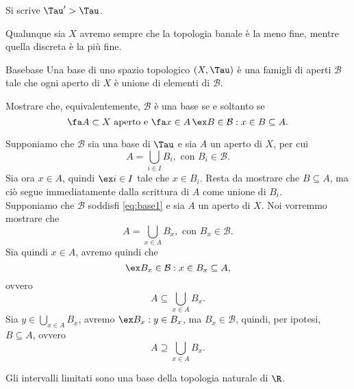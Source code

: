 \begin{notz}
    Si scrive \(\Tau'>\Tau\).
\end{notz}

\begin{oss}
    Qualunque sia \(X\) avremo sempre che la topologia banale è la meno fine, mentre quella discreta è la più fine.
\end{oss}

\begin{defn}{Base}{base}
    Una base di uno spazio topologico \((X,\Tau)\) è una famigli di aperti \(\mathcal{B}\) tale che ogni aperto di \(X\) è unione di elementi di \(\mathcal{B}\).
\end{defn}

\begin{exe}
    Mostrare che, equivalentemente, \(\mathcal{B}\) è una base se e soltanto se
    \begin{equation}\label{eq:base1}
        \fa A\subset X\text{ aperto e }\fa x\in A\,\ex B\in\mathcal{B}:x\in B\subseteq A.
    \end{equation}
\end{exe}

\begin{sol}
    \graffito{\(\Rightarrow)\)}Supponiamo che \(\mathcal{B}\) sia una base di \(\Tau\) e sia \(A\) un aperto di \(X\), per cui
    \[
        A=\bigcup_{i\in I}B_i,\text{ con }B_i\in\mathcal{B}.
    \]
    Sia ora \(x\in A\), quindi \(\ex i\in I\) tale che \(x\in B_i\).
    Resta da mostrare che \(B\subseteq A\), ma ciò segue immediatamente dalla scrittura di \(A\) come unione di \(B_i\).\\
    \graffito{\(\Leftarrow)\)}Supponiamo che \(\mathcal{B}\) soddisfi \eqref{eq:base1} e sia \(A\) un aperto di \(X\).
    Noi vorremmo mostrare che
    \[
        A=\bigcup_{x\in A}B_x,\text{ con }B_x\in\mathcal{B}.
    \]
    Sia quindi \(x\in A\), avremo quindi che
    \[
        \ex B_x\in\mathcal{B}:x\in B_x\subseteq A,
    \]
    ovvero
    \[
        A\subseteq\bigcup_{x\in A}B_x.
    \]
    Sia \(y\in\bigcup_{x\in A}B_x\), avremo \(\ex B_x:y\in B_x\), ma \(B_x\in \mathcal{B}\), quindi, per ipotesi, \(B\subseteq A\), ovvero
    \[
        A\supseteq\bigcup_{x\in A}B_x.
    \]
\end{sol}

\begin{ese}
    Gli intervalli limitati sono una base della topologia naturale di \(\R\).
\end{ese}

